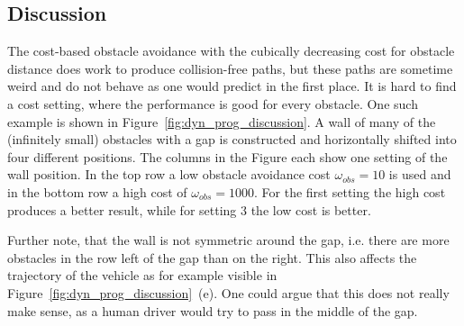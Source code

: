 \subsection{Discussion}
The cost-based obstacle avoidance with the cubically decreasing cost for obstacle distance does work to produce collision-free paths, but these paths are sometime weird and do not behave as one would predict in the first place.
It is hard to find a cost setting, where the performance is good for every obstacle.
One such example is shown in Figure~\ref{fig:dyn_prog_discussion}.
A wall of many of the (infinitely small) obstacles with a gap is constructed and horizontally shifted into four different positions.
The columns in the Figure each show one setting of the wall position.
In the top row a low obstacle avoidance cost $\omega_{obs}=10$ is used and in the bottom row a high cost of $\omega_{obs}=1000$.
For the first setting the high cost produces a better result, while for setting 3 the low cost is better.

Further note, that the wall is not symmetric around the gap, i.e. there are more obstacles in the row left of the gap than on the right.
This also affects the trajectory of the vehicle as for example visible in Figure~\ref{fig:dyn_prog_discussion}~(e).
One could argue that this does not really make sense, as a human driver would try to pass in the middle of the gap.

